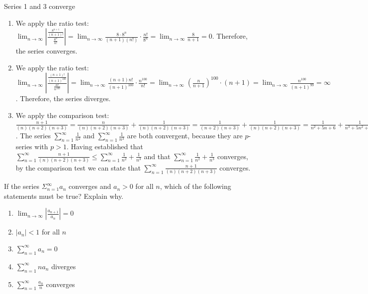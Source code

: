 \begin{Answer}[ref = ratio1]
Series 1 and 3 converge
\begin{enumerate}
\item We apply the ratio test: $\lim_{n \to \infty} \left| \frac{\frac{8^
{n + 1}}{(n + 1)!}}{\frac{8^n}{n!}} \right| = \lim_{n \to \infty} \frac{8 
\cdot 8^n}{(n + 1)(n!)} \cdot \frac{n!}{8^n} = \lim_{n \to \infty} 
\frac{8}{n + 1} = 0$. Therefore, the series converges. 
\item We apply the ratio test: $\lim_{n \to \infty} \left| \frac{\frac{(n + 1)!}
{(n + 1)^{100}}}{\frac{n!}{n^{100}}} \right| = \lim_{n \to \infty} \frac{(n + 1)
n!}{(n + 1)^{100}} \cdot \frac{n^{100}}{n!} = \lim_{n \to \infty} \left( 
\frac{n}{n + 1} \right)^{100} \cdot (n + 1) = \lim_{n \to \infty} \frac{n^{100}
}{(n + 1)^{99}} = \infty$. Therefore, the series diverges. 
\item We apply the comparison test: $\frac{n + 1}{(n)(n + 2)(n + 3)} = \frac{n}
{(n)(n + 2)(n + 3)} + \frac{1}{(n)(n + 2)(n + 3)} = \frac{1}{(n + 2)(n + 3)} + 
\frac{1}{(n)(n + 2)(n + 3)} = \frac{1}{n^2 + 5n + 6} + \frac{1}{n^3 + 5n^2 + 
6n} \leq \frac{1}{n^2} + \frac{1}{n^3}$. The series $\sum_{n = 1}^\infty 
\frac{1}{n^2}$ and $\sum_{n = 1}^\infty \frac{1}{n^3}$ are both convergent, 
because they are $p$-series with $p > 1$. Having established that $\sum_{n=1}
^\infty \frac{n + 1}{(n)(n + 2)(n + 3)} \leq \sum_{n=1}^\infty \frac{1}{n^2} 
+ \frac{1}{n^3}$ and that $\sum_{n=1}^\infty \frac{1}{n^2} + \frac{1}{n^3}$ 
converges, by the comparison test we can state that $\sum_{n=1}^\infty 
\frac{n + 1}{(n)(n+2)(n+3)}$ converges. 
\end{enumerate}
\end{Answer}

\begin{Exercise}If the series $\Sigma_{n = 1}^\infty 
a_n$ converges and $a_n > 0$ for all $n$, which of the following statements 
must be true? Explain why. 
\begin{enumerate}
\item $\lim_{n \to \infty} \left| \frac{a_{n + 1}}{a_n} \right| = 0$
\item $|a_n|<1$ for all $n$
\item $\sum_{n=1}^\infty a_n = 0$
\item $\sum_{n=1}^\infty na_n$ diverges
\item $\sum_{n=1}^\infty \frac{a_n}{n}$ converges
\end{enumerate}
\end{Exercise}

